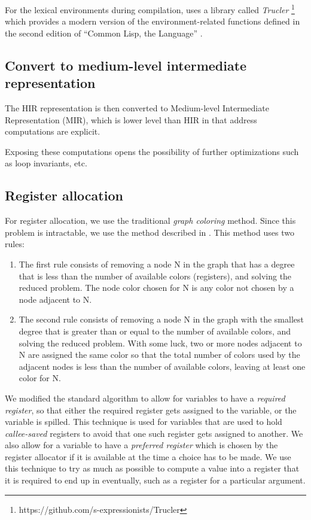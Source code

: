 For the lexical environments during compilation, \sysname uses a
library called \emph{Trucler}%
\footnote{https://github.com/s-expressionists/Trucler} which provides
a modern version of the environment-related functions defined in
the second edition of ``Common Lisp, the Language''
\cite{Steele:1990:CLL:95411}.

\subsection{Convert to medium-level intermediate representation}

The HIR representation is then converted to Medium-level Intermediate
Representation (MIR), which is lower level than HIR in that address
computations are explicit.

Exposing these computations opens the possibility of further
optimizations such as loop invariants, etc.

\subsection{Register allocation}

For register allocation, we use the traditional \emph{graph coloring}
method.  Since this problem is intractable, we use the method
described in \cite{Muchnick:1998:ACD:286076}.  This method uses two
rules:

\begin{enumerate}
\item The first rule consists of removing a node N in the graph that
  has a degree that is less than the number of available colors
  (registers), and solving the reduced problem.  The node color chosen
  for N is any color not chosen by a node adjacent to N.
\item The second rule consists of removing a node N in the graph with
  the smallest degree that is greater than or equal to the number of
  available colors, and solving the reduced problem.  With some luck,
  two or more nodes adjacent to N are assigned the same color so that
  the total number of colors used by the adjacent nodes is less than
  the number of available colors, leaving at least one color for N.
\end{enumerate}

We modified the standard algorithm to allow for variables to have a
\emph{required register}, so that either the required register gets
assigned to the variable, or the variable is spilled.  This technique
is used for variables that are used to hold \emph{callee-saved}
registers to avoid that one such register gets assigned to another.
We also allow for a variable to have a \emph{preferred register} which
is chosen by the register allocator if it is available at the time a
choice has to be made.  We use this technique to try as much as
possible to compute a value into a register that it is required to end
up in eventually, such as a register for a particular argument.%

